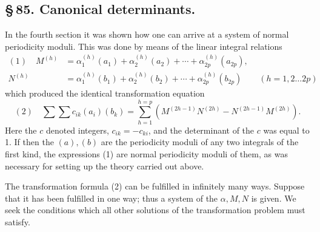 \documentclass[10pt]{article}
\begin{document}
\subsection*{\S\,85. Canonical determinants.}

In the fourth section it was shown how one can arrive at a system of normal periodicity moduli. This was done by means of the linear integral relations
\[
\begin{aligned}
(1)\quad
M^{(h)}&=\alpha_1^{(h)}(a_1)+\alpha_2^{(h)}(a_2)+\cdots+\alpha_{2p}^{(h)}(a_{2p}),\\
N^{(h)}&=\alpha_1^{(h)}(b_1)+\alpha_2^{(h)}(b_2)+\cdots+\alpha_{2p}^{(h)}(b_{2p})
\qquad (h=1,2\ldots2p)
\end{aligned}
\]
which produced the identical transformation equation
\[
(2)\quad
\sum\sum c_{ik}(a_i)(b_k)
=\sum_{h=1}^{h=p}\left(M^{(2h-1)}N^{(2h)}-N^{(2h-1)}M^{(2h)}\right).
\]
Here the \(c\) denoted integers, \(c_{ik}=-c_{ki}\), and the determinant of the \(c\) was equal to 1. If then the \((a),(b)\) are the periodicity moduli of any two integrals of the first kind, the expressions (1) are normal periodicity moduli of them, as was necessary for setting up the theory carried out above.

The transformation formula (2) can be fulfilled in infinitely many ways. Suppose that it has been fulfilled in one way; thus a system of the \(\alpha,M,N\) is given. We seek the conditions which all other solutions of the transformation problem must satisfy.
\end{document}
